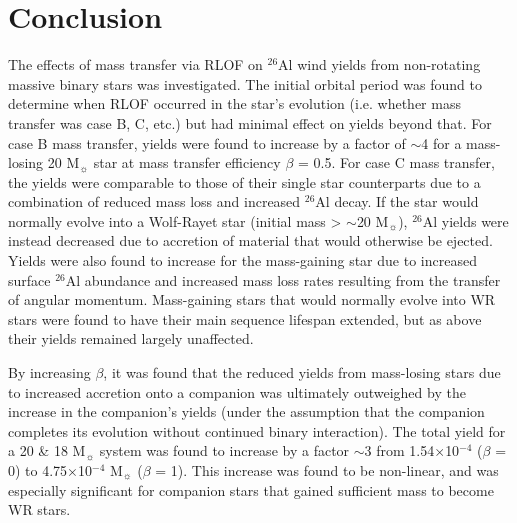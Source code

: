 \section{Conclusion} %

The effects of mass transfer via RLOF on $^{26}$Al wind yields from non-rotating massive binary stars was investigated.
The initial orbital period was found to determine when RLOF occurred in the star's evolution (i.e. whether mass transfer was case B, C, etc.) but had minimal effect on yields beyond that.
For case B mass transfer, yields were found to increase by a factor of $\sim$4 for a mass-losing 20 M$_{\sun}$ star at mass transfer efficiency $\beta$ = 0.5.
For case C mass transfer, the yields were comparable to those of their single star counterparts due to a combination of reduced mass loss and increased $^{26}$Al decay.
If the star would normally evolve into a Wolf-Rayet star (initial mass > $\sim$20 M$_{\sun}$), $^{26}$Al yields were instead decreased due to accretion of material that would otherwise be ejected.
Yields were also found to increase for the mass-gaining star due to increased surface $^{26}$Al abundance and increased mass loss rates resulting from the transfer of angular momentum.
Mass-gaining stars that would normally evolve into WR stars were found to have their main sequence lifespan extended, but as above their yields remained largely unaffected.

By increasing $\beta$, it was found that the reduced yields from mass-losing stars due to increased accretion onto a companion was ultimately outweighed by the increase in the companion's yields (under the assumption that the companion completes its evolution without continued binary interaction).
The total yield for a 20 \& 18 M$_{\sun}$ system was found to increase by a factor $\sim$3 from 1.54$\times$10$^{-4}$ ($\beta$ = 0) to 4.75$\times$10$^{-4}$ M$_{\sun}$ ($\beta$ = 1).
This increase was found to be non-linear, and was especially significant for companion stars that gained sufficient mass to become WR stars.